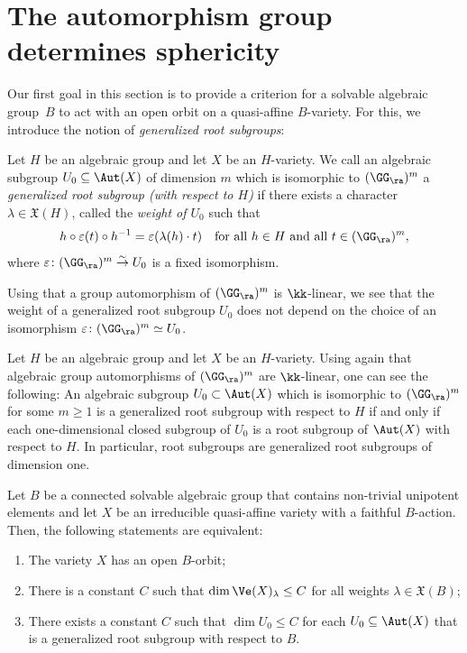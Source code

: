\section{The automorphism group determines sphericity}
\label{sec.determination_of_sphericity}

Our first goal in this section is to provide a criterion for a solvable algebraic group~$B$
to act with an open orbit on a quasi-affine $B$-variety.
For this, we introduce the notion of \emph{generalized root
subgroups}:

\begin{definition}
\label{def.generalized_root_subgroup}
Let $H$ be an algebraic group and let $X$ be an $H$-variety.
We call an algebraic subgroup $U_0 \subseteq \Aut(X)$ of dimension $m$
which is isomorphic to $(\GG_\ra)^m$ a
\emph{generalized root subgroup (with respect to $H$)}
if there exists a character $\lambda \in \mathfrak{X}(H)$, called the \emph{weight of $U_0$} such that
\[
h \circ \varepsilon(t) \circ h^{-1} = \varepsilon(\lambda(h) \cdot t) \quad
\textrm{for all $h \in H$ and all $t \in (\GG_\ra)^m$},
\]
where $\varepsilon \colon (\GG_\ra)^m \stackrel{\sim}{\to} U_0$ is a fixed isomorphism.
\end{definition}

Using that a group automorphism of $(\GG_\ra)^m$ is $\kk$-linear, we
see that the weight of a generalized root subgroup $U_0$ does not depend on the choice
of an isomorphism $\varepsilon \colon (\GG_\ra)^m \simeq U_0$.

\begin{remark}
\label{rem.equivalent_def_gen_root_subgroup}
Let $H$ be an algebraic group and let $X$ be an $H$-variety.
Using again that algebraic
group automorphisms of $(\GG_\ra)^m$ are $\kk$-linear, one can see the following:
An algebraic subgroup $U_0 \subset \Aut(X)$
which is isomorphic to $(\GG_\ra)^m$ for some $m \geq 1$
is a generalized root subgroup with respect to $H$
if and only if each one-dimensional closed subgroup of $U_0$ is a root subgroup of $\Aut(X)$
with respect to $H$.
In particular, root subgroups are generalized root subgroups of dimension one.
\end{remark}

\begin{proposition}
\label{prop:characterization_of_aff_spherical_var}
Let $B$ be a connected solvable algebraic group that contains non-trivial unipotent elements and
let $X$ be an irreducible quasi-affine variety with a faithful $B$-action.
Then, the following statements are equivalent:
\begin{enumerate}
\item \label{item:Open_B-orbit} The variety $X$ has an open $B$-orbit;
\item \label{item:Boundedness_of_homogeneous_LNDs}
There is a constant $C$ such that $\dim \Ve(X)_{\lambda} \leq C$
for all weights $\lambda \in \mathfrak{X}(B)$;
\item \label{item:Commutative_unipot_subgroups}
There exists a constant $C$ such that
$\dim U_0 \leq C$ for each $U_0 \subseteq \Aut(X)$ that is a
generalized root subgroup with respect to $B$.
\end{enumerate}
\end{proposition}

